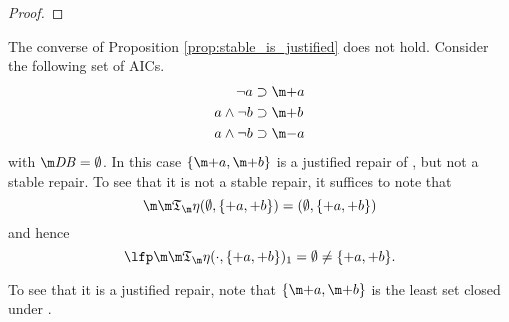 \begin{proof}
% 
% 
% 
% 
% 
% 
% 
%  
%  
%  
% 
% 
% 
% 
%  
%  
%  
%  
\end{proof}

\begin{example}\label{ex:justified_not_stable}
 The converse of Proposition \ref{prop:stable_is_justified} does not hold. Consider the following set \aics of AICs. 
 \begin{align*}
  \lnot a &\aicrule \add a \\
  a\land \lnot b &\aicrule \add b\\
  a \land \lnot b &\aicrule \remove a
 \end{align*}
 with $\db=\emptyset$. 
 In this case $\{\add a,\add b\}$ is a justified repair of \fulldb, but not a stable repair. 
 To see that it is not a stable repair, it suffices to note that 
 \[
 \Ap(\emptyset,\{+a,+b\}) = (\emptyset,\{+a,+b\})
 \]
 and hence
 \[
 \lfp \Ap(\cdot,\{+a,+b\})_1 = \emptyset\neq \{+a,+b\}.\]
  
To see that it is a justified repair, note that $\{\add a,\add b\}$ is the least set closed under \aics. 
\end{example}

